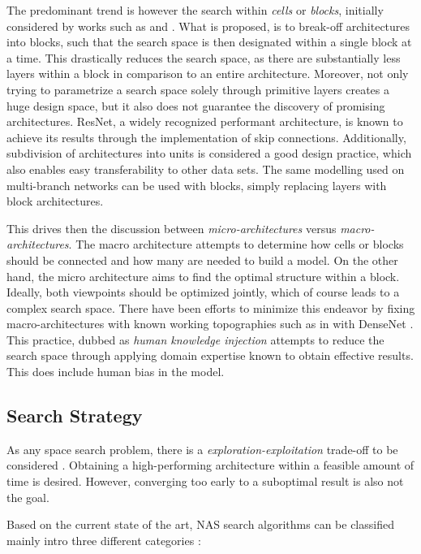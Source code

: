 \documentclass[10pt,        %
               a4paper,     %
               journal,     %
               ]{IEEEtran}
\begin{document}
The predominant trend is however the search within \textit{cells} or \textit{blocks}, initially considered by works such as
\cite{zhong2018practical} and \cite{zoph2018learning}. What is proposed, is to break-off architectures into blocks, such that
the search space is then designated within a single block at a time. This drastically reduces the search space, as there are
substantially less layers within a block in comparison to an entire architecture. Moreover, not only trying to parametrize a search
space solely through primitive layers creates a huge design space, but it also does not guarantee the discovery of
promising architectures. ResNet, a widely recognized performant architecture, is known to achieve its results through the
implementation of skip connections. Additionally, subdivision of architectures into units is considered a good
design practice, which also enables easy transferability to other data sets. The same modelling used on multi-branch
networks can be used with blocks, simply replacing layers with block architectures.

This drives then the discussion between \textit{micro-architectures} versus \textit{macro-architectures}. The macro architecture
attempts to determine how cells or blocks should be connected and how many are needed to build a model. On the other hand, the micro
architecture aims to find the optimal structure within a block. Ideally, both viewpoints should be optimized jointly, which of course
leads to a complex search space. There have been efforts to minimize this endeavor by fixing macro-architectures with
known working topographies such as in \cite{pmlr-v80-cai18a} with DenseNet \cite{Huang_2017_CVPR}. This practice, dubbed as
\textit{human knowledge injection} attempts to reduce the search space through applying domain expertise known to obtain
effective results. This does include human bias in the model.

\subsection{Search Strategy}
As any space search problem, there is a \textit{exploration-exploitation} trade-off to be considered \cite{elsken2019neural}.
Obtaining a high-performing architecture within a feasible amount of time is desired. However, converging too early to a
suboptimal result is also not the goal.

Based on the current state of the art, NAS search algorithms can be classified mainly intro three different
categories \cite{liu2021survey}:
\end{document}

